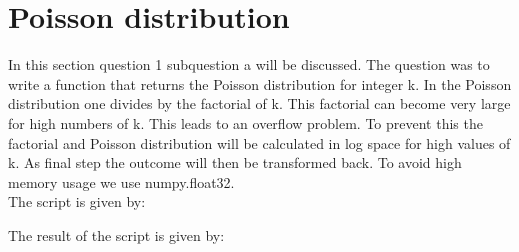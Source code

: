 \section{Poisson distribution}

In this section question 1 subquestion a will be discussed. The question was to write a function that returns the Poisson distribution for integer k. In the Poisson distribution one divides by the factorial of k. This factorial can become very large for high numbers of k. This leads to an overflow problem. To prevent this the factorial and Poisson distribution will be calculated in log space for high values of k. As final step the outcome will then be transformed back. To avoid high memory usage we use numpy.float32. \\

The script is given by:


The result of the script is given by:

